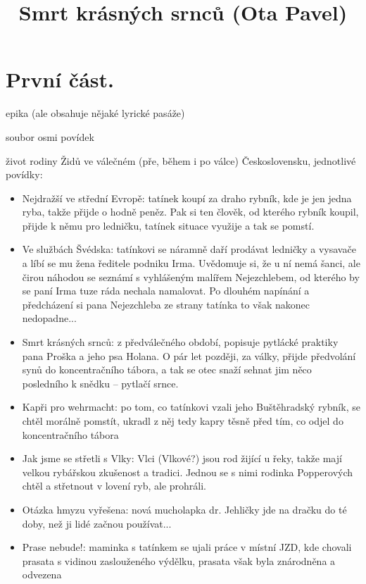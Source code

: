 \documentclass{article}
\title{\vspace{-2cm}Smrt krásných srnců (Ota Pavel)\vspace{-2cm}}
\date{}
\author{}
\begin{document}
\maketitle
\section{První část.}
\begin{description}
    \setlength\itemsep{0.15em}
    \item[druh:] epika (ale obsahuje nějaké lyrické pasáže)
    \item[žánr:] soubor osmi povídek
    \item[téma:] život rodiny Židů ve válečném (pře, během i po válce) Československu, jednotlivé povídky:
    \begin{itemize}
    \item Nejdražší ve střední Evropě: tatínek koupí za draho rybník, kde je jen jedna ryba, takže přijde o hodně peněz. Pak si ten člověk, od kterého rybník koupil, přijde k němu pro ledničku, tatínek situace využije a tak se pomstí.
   	\item Ve službách Švédska: tatínkovi se náramně daří prodávat ledničky a vysavače a líbí se mu žena ředitele podniku Irma. Uvědomuje si, že u ní nemá šanci, ale čirou náhodou se seznámí s vyhlášeným malířem Nejezchlebem, od kterého by se paní Irma tuze ráda nechala namalovat. Po dlouhém napínání a předcházení si pana Nejezchleba ze strany tatínka to však nakonec nedopadne...
   	\item Smrt krásných srnců: z předválečného období, popisuje pytlácké praktiky pana Proška a jeho psa Holana. O pár let později, za války, přijde předvolání synů do koncentračního tábora, a tak se otec snaží sehnat jim něco posledního k snědku -- pytlačí srnce.
   	\item Kapři pro wehrmacht: po tom, co tatínkovi vzali jeho Buštěhradský rybník, se chtěl morálně pomstít, ukradl z něj tedy kapry těsně před tím, co odjel do koncentračního tábora
   	\item Jak jsme se střetli s Vlky: Vlci (Vlkové?) jsou rod žijící u řeky, takže mají velkou rybářskou zkušenost a tradici. Jednou se s nimi rodinka Popperových chtěl a střetnout v lovení ryb, ale prohráli.
   	\item Otázka hmyzu vyřešena: nová mucholapka dr. Jehličky jde na dračku do té doby, než ji lidé začnou používat...
   	\item Prase nebude!: maminka s tatínkem se ujali práce v místní JZD, kde chovali prasata s vidinou zaslouženého výdělku, prasata však byla znárodněna a odvezena

\end{itemize}
\end{description}
\end{document}
